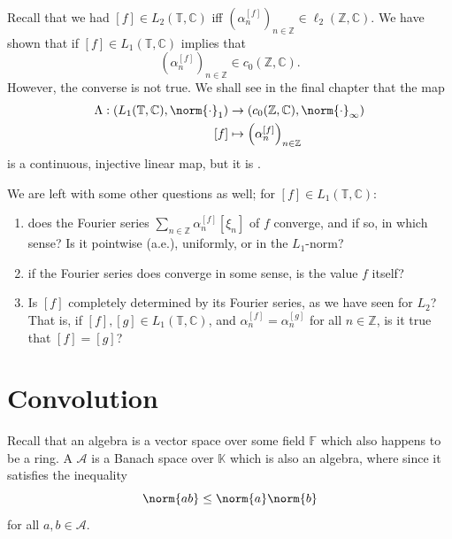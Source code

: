 \documentclass[notoc,notitlepage]{tufte-book}
\begin{document}
\begin{remark}
  Recall that we had $[f] \in L_2(\mathbb{T}, \mathbb{C})$ iff
  $(\alpha_n^{[f]})_{n \in \mathbb{Z}} \in \ell_2(\mathbb{Z}, \mathbb{C})$.
  We have shown that if $[f] \in L_1(\mathbb{T}, \mathbb{C})$ implies that
  \begin{equation*}
    (\alpha_n^{[f]})_{n \in \mathbb{Z}} \in c_0(\mathbb{Z}, \mathbb{C}).
  \end{equation*}
  However, the converse is not true. We shall see in the final chapter
  that the map
  \begin{align*}
    \Lambda : (L_1(\mathbb{T}, \mathbb{C}), \norm{\cdot}_1)
          &\to (c_0(\mathbb{Z}, \mathbb{C}), \norm{\cdot}_\infty) \\
      [f] &\mapsto \left( \alpha_n^{[f]} \right)_{n \in \mathbb{Z}}
  \end{align*}
  is a continuous, injective linear map, but it is .
\end{remark}

We are left with some other questions as well;
for $[f] \in L_1(\mathbb{T}, \mathbb{C})$:
\begin{enumerate}
  \item does the Fourier series $\sum_{n \in \mathbb{Z}} \alpha_n^{[f]} [\xi_n]$
    of $f$ converge, and if so, in which sense?
    Is it pointwise (a.e.), uniformly, or in the $L_1$-norm?
  \item if the Fourier series does converge in some sense,
    is the value $f$ itself?
  \item Is $[f]$ completely determined by its Fourier series, as
    we have seen for $L_2$? That is, if $[f], [g] \in L_1(\mathbb{T}, \mathbb{C})$,
    and $\alpha_n^{[f]} = \alpha_n^{[g]}$ for all $n \in \mathbb{Z}$,
    is it true that $[f] = [g]$?
\end{enumerate}


\section{Convolution}%
\label{sec:convolution}

Recall that an algebra is a vector space over some field $\mathbb{F}$
which also happens to be a ring.
A  $\mathcal{A}$ is a Banach space over $\mathbb{K}$
which is also an algebra, where  
since it satisfies the inequality
\begin{equation*}
  \norm{ab} \leq \norm{a} \norm{b}
\end{equation*}
for all $a, b \in \mathcal{A}$.
\end{document}
